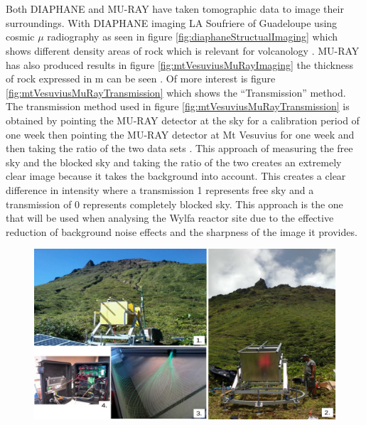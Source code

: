 \\\\Both DIAPHANE and MU-RAY have taken tomographic data to image their surroundings. With DIAPHANE imaging LA Soufriere of Guadeloupe using cosmic $\mu$ radiography as seen in figure \ref{fig:diaphaneStructualImaging} which shows different density areas of rock which is relevant for volcanology \cite{Marteau_2017}. MU-RAY has also produced results in figure \ref{fig:mtVesuviusMuRayImaging} the thickness of rock expressed in m can be seen \cite{Ambrosino_2014}. Of more interest is figure \ref{fig:mtVesuviusMuRayTransmission} which shows the ``Transmission'' method. The transmission method used in figure \ref{fig:mtVesuviusMuRayTransmission} is obtained by pointing the MU-RAY detector at the sky for a calibration period of one week then pointing the MU-RAY detector at Mt Vesuvius for one week and then taking the ratio of the two data sets \cite{Ambrosino_2014}. This approach of measuring the free sky and the blocked sky and taking the ratio of the two creates an extremely clear image because it takes the background into account. This creates a clear difference in intensity where a transmission 1 represents free sky and a transmission of 0 represents completely blocked sky. This approach is the one that will be used when analysing the Wylfa reactor site due to the effective reduction of background noise effects and the sharpness of the image it provides. 

\begin{figure}[htbp]
 \centering
 \includegraphics[width=1.0\linewidth]{Chapter5/Figs/Raster/DIAPHANE_deployment.png}
 \label{fig:DIAPHANE_deployment}
\end{figure}

